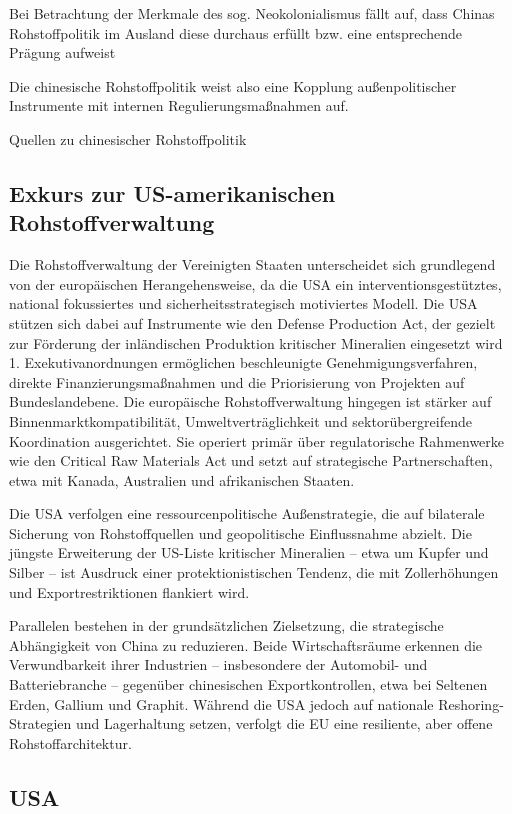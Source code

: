 \documentclass[12pt,a4paper,oneside]{book} %
\begin{document}
Bei Betrachtung der Merkmale des sog. Neokolonialismus fällt auf, dass Chinas Rohstoffpolitik im Ausland diese durchaus erfüllt bzw. eine entsprechende Prägung aufweist

Die chinesische Rohstoffpolitik weist also eine Kopplung außenpolitischer Instrumente mit internen Regulierungsmaßnahmen auf.

Quellen zu chinesischer Rohstoffpolitik

\subsection{Exkurs zur US-amerikanischen Rohstoffverwaltung}
Die Rohstoffverwaltung der Vereinigten Staaten unterscheidet sich grundlegend von der europäischen Herangehensweise, da die USA ein interventionsgestütztes, national fokussiertes und sicherheitsstrategisch motiviertes Modell. Die USA stützen sich dabei auf Instrumente wie den Defense Production Act, der gezielt zur Förderung der inländischen Produktion kritischer Mineralien eingesetzt wird 1. Exekutivanordnungen ermöglichen beschleunigte Genehmigungsverfahren, direkte Finanzierungsmaßnahmen und die Priorisierung von Projekten auf Bundeslandebene. Die europäische Rohstoffverwaltung hingegen ist stärker auf Binnenmarktkompatibilität, Umweltverträglichkeit und sektorübergreifende Koordination ausgerichtet. Sie operiert primär über regulatorische Rahmenwerke wie den Critical Raw Materials Act und setzt auf strategische Partnerschaften, etwa mit Kanada, Australien und afrikanischen Staaten.

Die USA verfolgen eine ressourcenpolitische Außenstrategie, die auf bilaterale Sicherung von Rohstoffquellen und geopolitische Einflussnahme abzielt. Die jüngste Erweiterung der US-Liste kritischer Mineralien – etwa um Kupfer und Silber – ist Ausdruck einer protektionistischen Tendenz, die mit Zollerhöhungen und Exportrestriktionen flankiert wird.

Parallelen bestehen in der grundsätzlichen Zielsetzung, die strategische Abhängigkeit von China zu reduzieren. Beide Wirtschaftsräume erkennen die Verwundbarkeit ihrer Industrien – insbesondere der Automobil- und Batteriebranche – gegenüber chinesischen Exportkontrollen, etwa bei Seltenen Erden, Gallium und Graphit. Während die USA jedoch auf nationale Reshoring-Strategien und Lagerhaltung setzen, verfolgt die EU eine resiliente, aber offene Rohstoffarchitektur.

\subsection{USA}
\end{document}
